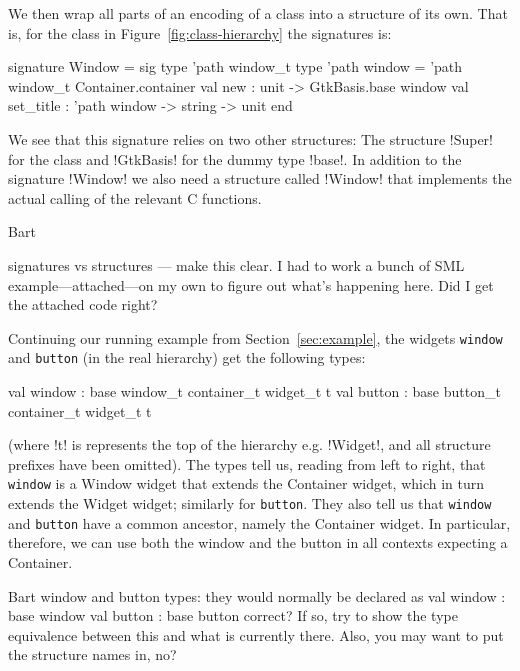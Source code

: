 \documentclass[workingdraft]{usetex-v1}
\begin{document}
We then wrap all parts of an encoding of a class into a structure of
its own.  That is, for the class  in
Figure~\ref{fig:class-hierarchy} the \sml signatures is:
\begin{SMLcode}
signature Window =
sig
  type 'path window_t
  type 'path window = 
         'path window_t Container.container
  val new : unit 
            -> GtkBasis.base window
  val set_title : 'path window -> string 
                                 -> unit
end
\end{SMLcode}
We see that this signature relies on two other structures:  The
structure !Super! for the class  and !GtkBasis! for
the dummy type !base!.  In addition to the signature !Window! we also
need a structure called !Window! that implements the actual calling of
the relevant \gtk C functions.

\begin{ednote}{Bart}
  
signatures vs structures --- make this clear.  I had to work
a bunch of SML example---attached---on my own to figure out
what's happening here.  Did I get the attached code right?

\end{ednote}

Continuing our running example from Section~\ref{sec:example}, the
widgets \texttt{window} and \texttt{button} (in the real \gtk
hierarchy) get the following types:
\begin{SMLcode}
val window : 
     base window_t container_t widget_t t
val button : 
     base button_t container_t widget_t t
\end{SMLcode}
(where !t! is represents the top of the hierarchy e.g. !Widget!, and all
structure prefixes have been omitted).  The types tell us, reading from
left to right, that \texttt{window} is a Window widget that extends
the Container widget, which in turn extends the Widget widget;
similarly for \texttt{button}. They also tell us that \texttt{window}
and \texttt{button} have a common ancestor, namely the Container
widget.  In particular, therefore, we can use both the window and the
button in all contexts expecting a Container.

\begin{ednote}{Bart}
  window and button types: they would normally be declared as
  val window : base window
  val button : base button
correct?  If so, try to show the type equivalence between
this and what is currently there.  Also, you may want to put
the structure names in, no?
\end{ednote}
\end{document}
